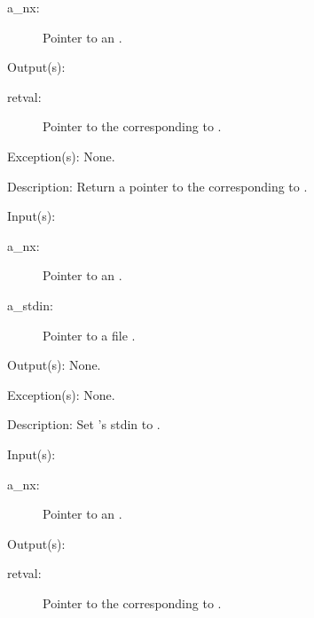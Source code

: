 \begin{capi}
\begin{capilist}
\begin{description}
		\item[a\_nx: ]
			Pointer to an .
		\end{description}
	\item[Output(s): ]
		\begin{description}\item[]
		\item[retval: ]
			Pointer to the  corresponding to
			.
		\end{description}
	\item[Exception(s): ] None.
	\item[Description: ]
		Return a pointer to the  corresponding to
		.
	\end{capilist}
\label{nx_stdin_set}
	\begin{capilist}
	\item[Input(s): ]
		\begin{description}\item[]
		\item[a\_nx: ]
			Pointer to an .
		\item[a\_stdin: ]
			Pointer to a file .
		\end{description}
	\item[Output(s): ] None.
	\item[Exception(s): ] None.
	\item[Description: ]
		Set 's stdin to .
	\end{capilist}
\label{nx_stdout_get}
	\begin{capilist}
	\item[Input(s): ]
		\begin{description}\item[]
		\item[a\_nx: ]
			Pointer to an \classname{nx}.
		\end{description}
	\item[Output(s): ]
		\begin{description}\item[]
		\item[retval: ]
			Pointer to the  corresponding to
			\onyxop{stdout}{}.
		\end{description}

\end{capilist}
\end{capi}
